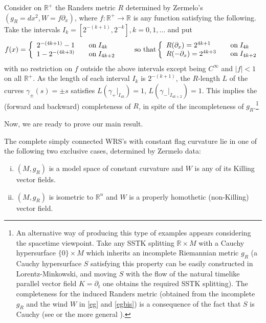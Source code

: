 \documentclass[reqno,10pt]{amsart}
\newcommand{\R}{\mathds R}
\begin{document}
\begin{exe}\label{ex1}
Consider on $\R^+$ the Randers metric $R$ determined by Zermelo's $(g_R=dx^2, W=f\partial_x)$, where $f:\R^+\rightarrow \R$ is any  function satisfying the following.  Take the intervals $I_k=[2^{-(k+1)}, 2^{-k}], k=0, 1,\dots$  and put
$$
f(x)=
\left\{\begin{array}{lrl}
2^{-(4k+1)}-1 & & \hbox{on} \; I_{4k} \\
1-2^{-(4k+3)} & & \hbox{on} \; I_{ 4 k+2} 
\end{array}\right.
\qquad 
\hbox{so that} 
\left\{\begin{array}{lrl}
R(\partial_x)=2^{4k+1} & & \hbox{on} \; I_{4k} \\
R(-\partial_x)=2^{4k+3} & & \hbox{on} \; I_{4 k+2} 
\end{array}\right.
$$
with no  restriction on $f$ outside the above intervals except being $C^\infty$ and $|f|<1$ on all $\R^+$. As the length of each interval $I_k$ is $2^{-(k+1)}$,  the $R$-length $L$ of the  curves $\gamma_\pm(s)=\pm s$ satisfies  $L(\gamma_+|_{I_{4k}})=1$, $L(\gamma_-|_{I_{4k+2}})=1$. This implies the (forward and backward) completeness of  $R$, in spite of the incompleteness of 
$g_R$.\footnote{An alternative way of producing this  type of examples  appears considering the spacetime viewpoint. Take any SSTK splitting $\R\times M$ with a  Cauchy hypersurface $\{0\}\times M$ which inherits an incomplete Riemannian metric $g_R$ (a Cauchy hypersurface $S$ satisfying this property can be easily constructed in Lorentz-Minkowski, and moving $S$ with the flow of the natural timelike parallel vector field $K=\partial_t$ one obtains the required SSTK splitting). The completeness for the induced Randers metric  (obtained from the incomplete  $g_R$ and the wind $W$ in \eqref{eg} and \eqref{egbis}) is a consequence of the fact that $S$ is Cauchy (see \cite[Theorem 4.4]{CJS} or the more general  \cite[Theorem  5.11, part (iv)]{CJSwind}).}  
\end{exe}
 Now, we are ready to prove our main result. 
\begin{thm}\label{thm:globalresult}
The complete simply connected  WRS's   with constant flag curvature  lie in one of the following two exclusive cases, determined by Zermelo data: 
\begin{enumerate}[(i)]
\item  $(M,g_R)$ is a  model space of constant curvature  and $W$ is any of its Killing vector fields.

\item  $(M,g_R)$ is isometric to 
$\R^n$  and $W$ is  a properly homothetic (non-Killing) 
vector field.
\end{enumerate}
\end{thm}
\end{document}
